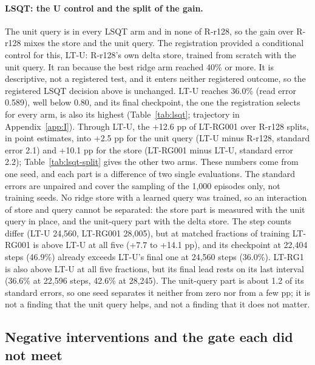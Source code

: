 \paragraph{LSQT: the U control and the split of the gain.}
The unit query is in every LSQT arm and in none of R-r128, so the gain over R-r128 mixes the store and the unit query.
The registration provided a conditional control for this, LT-U: R-r128's own delta store, trained from scratch with the unit query.
It ran because the best ridge arm reached 40\% or more.
It is descriptive, not a registered test, and it enters neither registered outcome, so the registered LSQT decision above is unchanged.
LT-U reaches 36.0\% (read error 0.589), well below 0.80, and its final checkpoint, the one the registration selects for every arm, is also its highest (Table~\ref{tab:lsqt}; trajectory in Appendix~\ref{app:I}).  %
Through LT-U, the +12.6 pp of LT-RG001 over R-r128 splits, in point estimates, into +2.5 pp for the unit query (LT-U minus R-r128, standard error 2.1) and +10.1 pp for the store (LT-RG001 minus LT-U, standard error 2.2); Table~\ref{tab:lsqt-split} gives the other two arms.  %
These numbers come from one seed, and each part is a difference of two single evaluations.
The standard errors are unpaired and cover the sampling of the 1,000 episodes only, not training seeds.
No ridge store with a learned query was trained, so an interaction of store and query cannot be separated: the store part is measured with the unit query in place, and the unit-query part with the delta store.  %
The step counts differ (LT-U 24,560, LT-RG001 28,005), but at matched fractions of training LT-RG001 is above LT-U at all five (+7.7 to +14.1 pp), and its checkpoint at 22,404 steps (46.9\%) already exceeds LT-U's final one at 24,560 steps (36.0\%).  %
LT-RG1 is also above LT-U at all five fractions, but its final lead rests on its last interval (36.6\% at 22,596 steps, 42.6\% at 28,245).  %
The unit-query part is about 1.2 of its standard errors, so one seed separates it neither from zero nor from a few pp; it is not a finding that the unit query helps, and not a finding that it does not matter.  %

\lsqtsplittable

\subsection{Negative interventions and the gate each did not meet}
\label{sec:negmatrix}

